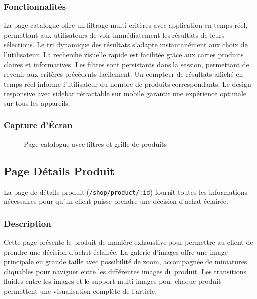 \documentclass[12pt,a4paper]{article}
\begin{document}
\subsubsection{Fonctionnalités}

La page catalogue offre un filtrage multi-critères avec application en temps réel, permettant aux utilisateurs de voir immédiatement les résultats de leurs sélections. Le tri dynamique des résultats s'adapte instantanément aux choix de l'utilisateur. La recherche visuelle rapide est facilitée grâce aux cartes produits claires et informatives. Les filtres sont persistants dans la session, permettant de revenir aux critères précédents facilement. Un compteur de résultats affiché en temps réel informe l'utilisateur du nombre de produits correspondants. Le design responsive avec sidebar rétractable sur mobile garantit une expérience optimale sur tous les appareils.

\subsubsection{Capture d'Écran}

\begin{figure}[H]
    \centering
    \caption{Page catalogue avec filtres et grille de produits}
    \label{fig:catalog}
\end{figure}

\subsection{Page Détails Produit}

La page de détails produit (\texttt{/shop/product/:id}) fournit toutes les informations nécessaires pour qu'un client puisse prendre une décision d'achat éclairée.

\subsubsection{Description}

Cette page présente le produit de manière exhaustive pour permettre au client de prendre une décision d'achat éclairée. La galerie d'images offre une image principale en grande taille avec possibilité de zoom, accompagnée de miniatures cliquables pour naviguer entre les différentes images du produit. Les transitions fluides entre les images et le support multi-images pour chaque produit permettent une visualisation complète de l'article.
\end{document}
